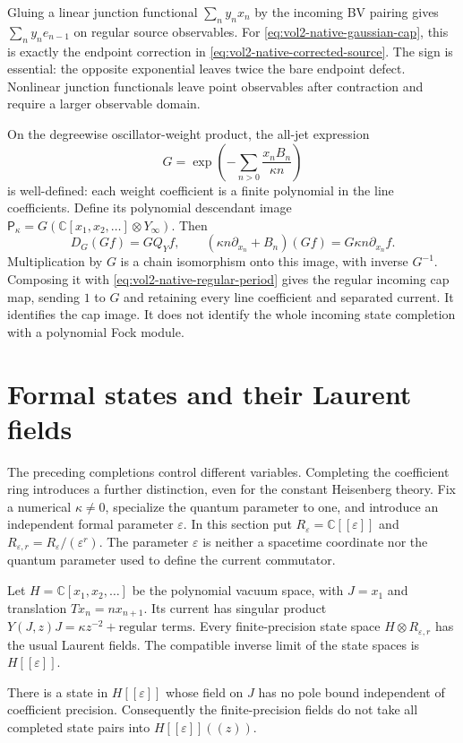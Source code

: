 Gluing a linear junction functional \(\sum_ny_nx_n\) by the incoming
BV pairing gives \(\sum_ny_ne_{n-1}\) on regular source observables.
For \eqref{eq:vol2-native-gaussian-cap}, this is exactly the endpoint
correction in \eqref{eq:vol2-native-corrected-source}.
The sign is essential: the opposite exponential leaves twice the bare
endpoint defect. Nonlinear junction functionals leave point observables
after contraction and require a larger observable domain.

On the degreewise oscillator-weight product, the all-jet expression
\[
 G=\exp\left(-\sum_{n>0}\frac{x_nB_n}{\kappa n}\right)
\]
is well-defined: each weight coefficient is a finite polynomial in the
line coefficients. Define its polynomial descendant image
\(\mathsf P_\kappa=G(\mathbb C[x_1,x_2,\ldots]\otimes Y_\infty)\).
Then
\[
 D_G(Gf)=GQ_Yf,
 \qquad
 (\kappa n\partial_{x_n}+B_n)(Gf)=G\kappa n\partial_{x_n}f.
\]
Multiplication by \(G\) is a chain isomorphism onto this image, with
inverse \(G^{-1}\). Composing it with
\eqref{eq:vol2-native-regular-period} gives the regular incoming cap map,
sending \(1\) to \(G\) and retaining every line coefficient and
separated current. It identifies the cap image. It does not identify the
whole incoming state completion with a polynomial Fock module.

\section{Formal states and their Laurent fields}

The preceding completions control different variables. Completing the
coefficient ring introduces a further distinction, even for the constant
Heisenberg theory. Fix a numerical \(\kappa\ne0\), specialize the quantum
parameter to one, and introduce an independent formal parameter
\(\varepsilon\). In this section put
\(R_\varepsilon=\mathbb C[[\varepsilon]]\) and
\(R_{\varepsilon,r}=R_\varepsilon/(\varepsilon^r)\).
The parameter \(\varepsilon\) is neither a spacetime coordinate nor the
quantum parameter used to define the current commutator.

Let \(H=\mathbb C[x_1,x_2,\ldots]\) be the polynomial vacuum space,
with \(J=x_1\) and translation \(Tx_n=nx_{n+1}\).
Its current has singular product
\(Y(J,z)J=\kappa z^{-2}+\text{regular terms}\).
Every finite-precision state space
\(H\otimes R_{\varepsilon,r}\) has the usual Laurent fields.
The compatible inverse limit of the state spaces is \(H[[\varepsilon]]\).

\begin{proposition}\label{prop:vol2-native-completed-state-pole}
There is a state in \(H[[\varepsilon]]\) whose field on \(J\) has
no pole bound independent of coefficient precision. Consequently the
finite-precision fields do not take all completed state pairs into
\(H[[\varepsilon]]((z))\).
\end{proposition}

